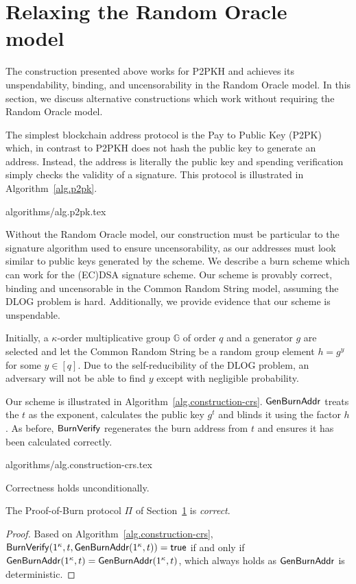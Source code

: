 \section{Relaxing the Random Oracle model}\label{sec:standard}

The construction presented above works for P2PKH and achieves its unspendability, binding, and uncensorability in the Random Oracle model. In this section, we discuss alternative constructions which work without requiring the Random Oracle model.

The simplest blockchain address protocol is the Pay to Public Key (P2PK) which, in contrast to P2PKH does not hash the public key to generate an address. Instead, the address is literally the public key and spending verification simply checks the validity of a signature. This protocol is illustrated in Algorithm~\ref{alg.p2pk}.

{algorithms/alg.p2pk.tex}

Without the Random Oracle model, our construction must be particular to the signature algorithm used to ensure uncensorability, as our addresses must look similar to public keys generated by the scheme. We describe a burn scheme which can work for the (EC)DSA signature scheme. Our scheme is provably correct, binding and uncensorable in the Common Random String model, assuming the DLOG problem is hard. Additionally, we provide evidence that our scheme is unspendable.

Initially, a $\kappa$-order multiplicative group $\mathbb{G}$ of order $q $ and a generator $g$ are selected and let the Common Random String be a random group element $h = g^y$ for some $y \in [q]$. Due to the self-reducibility of the DLOG problem, an adversary will not be able to find $y$ except with negligible probability.

Our scheme is illustrated in Algorithm~\ref{alg.construction-crs}. $\mathsf{Gen}\-\mathsf{Burn}\-\mathsf{Addr}$ treats the $t$ as the exponent, calculates the public key $g^t$ and blinds it using the factor $h$. As before, $\mathsf{BurnVerify}$ regenerates the burn address from $t$ and ensures it has been calculated correctly.

{algorithms/alg.construction-crs.tex}

Correctness holds unconditionally.

\begin{theorem}[Correctness]
  The Proof-of-Burn protocol $\Pi$ of Section~\ref{sec:standard} is \emph{correct}.
\end{theorem}
\begin{proof}
  Based on Algorithm~\ref{alg.construction-crs}, $\mathsf{BurnVerify}(1^\kappa, t, \mathsf{Gen}\-\mathsf{Burn}\-\mathsf{Addr}(1^\kappa, t)) = \textsf{true}$ if and only if $\mathsf{Gen}\-\mathsf{Burn}\-\mathsf{Addr}(1^\kappa, t) = \mathsf{Gen}\-\mathsf{Burn}\-\mathsf{Addr}(1^\kappa, t)$, which always holds as $\mathsf{Gen}\-\mathsf{Burn}\-\mathsf{Addr}$ is deterministic.
\end{proof}

